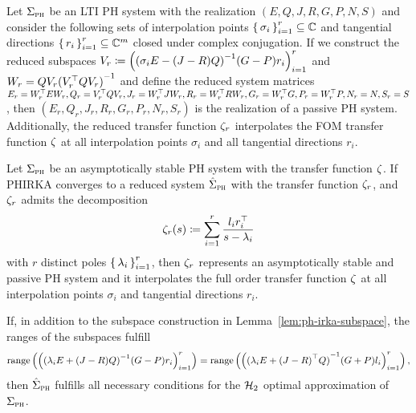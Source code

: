 \begin{lemma}\label{lem:ph-irka-subspace}
    Let $\Sigma_{\textnormal{\scshape ph}}$ be an \ac{LTI} \ac{PH} system with the realization $(E, Q, J, R, G, P, N, S)$ and consider the following sets of interpolation points ${\left\{\,\sigma_i\,\right\}}_{i = 1}^r \subseteq \mathbb{C}$ and tangential directions ${\left\{\,r_i\,\right\}}_{i = 1}^r \subseteq \mathbb{C}^m$ closed under complex conjugation.
    If we construct the reduced subspaces $V_r \coloneqq {\left( {(\sigma_i E - (J - R) Q)}\inv (G - P) r_i \right)}_{i = 1}^r$ and $W_r = Q V_r {(V_r\trans Q V_r)}\inv$ and define the reduced system matrices $E_r = W_r^{\top} E W_r, Q_r = V_r^{\top} Q V_r, J_r = W_r^{\top} J W_r, R_r = W_r^{\top} R W_r, G_r = W_r^{\top} G, P_r = W_r^{\top} P, N_r = N, S_r = S$, then $(E_r, Q_r, J_r, R_r, G_r, P_r, N_r, S_r)$ is the realization of a passive \ac{PH} system.
    Additionally, the reduced transfer function $\zeta_r$ interpolates the \ac{FOM} transfer function $\zeta$ at all interpolation points $\sigma_i$ and all tangential directions $r_i$.
\end{lemma}

\begin{theorem}\label{thm:ph-irka-subspace}
    Let $\Sigma_{\textnormal{\scshape ph}}$ be an asymptotically stable \ac{PH} system with the transfer function $\zeta$.
    If \ac{PHIRKA} converges to a reduced system $\hat{\Sigma}_{\textnormal{\scshape ph}}$ with the transfer function $\zeta_r$, and $\zeta_r$ admits the decomposition
    \begin{equation*}
        \zeta_r(s) \coloneqq \sum\limits_{i = 1}^r \frac{l_i r_i^{\top}}{s - \lambda_i}
    \end{equation*}
    with $r$ distinct poles ${\left\{\,\lambda_i\,\right\}}_{i = 1}^r$, then $\zeta_r$ represents an asymptotically stable and passive \ac{PH} system and it interpolates the full order transfer function $\zeta$ at all interpolation points $\sigma_i$ and tangential directions $r_i$.

    If, in addition to the subspace construction in Lemma~\ref{lem:ph-irka-subspace}, the ranges of the subspaces fulfill
    \begin{equation*}
        \range{{\left( {(\lambda_i E + (J - R) Q)}\inv (G - P) r_i \right)}_{i = 1}^r} = \range{{\left( {(\lambda_i E + {(J - R)}\trans Q)}\inv (G + P) l_i \right)}_{i = 1}^r},
    \end{equation*}
    then $\hat{\Sigma}_{\textnormal{\scshape ph}}$ fulfills all necessary conditions for the $\mathcal{H}_2$ optimal approximation of $\Sigma_{\textnormal{\scshape ph}}$.
\end{theorem}

